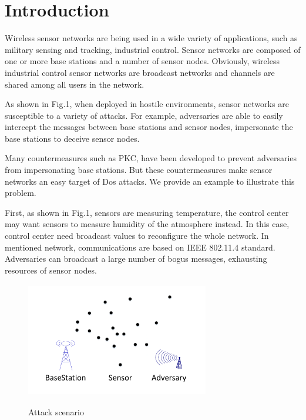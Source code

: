 \documentclass{sig-alternate-05-2015}
\begin{document}
%
%

%
%
\printccsdesc



\section{Introduction}
Wireless sensor networks are being used in a wide variety of applications, such as military sensing and tracking, industrial control. Sensor networks are composed of one or more base stations and a number of sensor nodes. Obviously, wireless industrial control sensor networks are broadcast networks and channels are shared among all users in the network. 

As shown in Fig.1, when deployed in hostile environments, sensor networks are susceptible to a variety of attacks. For example, adversaries are able to easily intercept the messages between base stations and sensor nodes, impersonate the base stations to deceive sensor nodes. 

Many countermeasures such as PKC, have been developed to prevent adversaries from impersonating base stations. But these countermeasures make sensor networks an easy target of Dos attacks. We provide an example to illustrate this problem. 

First, as shown in Fig.1, sensors are measuring temperature, the control center may want sensors to measure humidity of the atmosphere instead. In this case, control center need broadcast values to reconfigure the whole network. 
In mentioned network, communications are based on IEEE 802.11.4 standard. Adversaries can broadcast a large number of bogus messages, exhausting resources of sensor nodes.

\begin{figure}
\centering
\includegraphics[width=8cm,height=5cm]{Attack_Scenario2.pdf}\\
\caption{Attack scenario}\label{}   
\end{figure}
\end{document}
